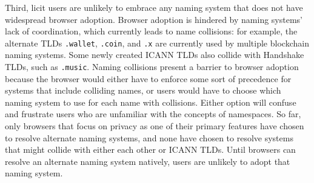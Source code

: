 Third, licit users are unlikely to embrace any naming system that does not have 
widespread browser 
adoption. Browser adoption is hindered by naming systems' lack of coordination, 
which currently leads 
to name collisions: for example, the alternate TLDs \texttt{.wallet}, 
\texttt{.coin}, and \texttt{.x} 
are currently used by multiple blockchain naming systems. Some newly created 
ICANN TLDs also collide 
with Handshake TLDs, such as \texttt{.music}. Naming collisions present a 
barrier to browser adoption 
because the browser would either have to enforce some sort of precedence for 
systems that include 
colliding names, or users would have to choose which naming system to use for 
each name with 
collisions. Either option will confuse and frustrate users who are unfamiliar 
with the concepts of 
namespaces. So far, only browsers that focus on privacy as one of their primary 
features have chosen 
to resolve alternate naming systems, and none have chosen to resolve systems 
that might collide with 
either each other or ICANN TLDs. Until browsers can resolve an alternate naming 
system natively, users 
are unlikely to adopt that naming system.